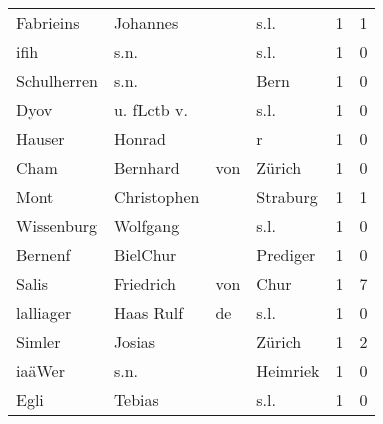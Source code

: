 \begin{center}
\begin{tiny}
\begin{longtabu}{llllrr}
                Fabrieins &                           Johannes &             &                                        s.l. &          1 &         1 \\
                     ifih &                               s.n. &             &                                        s.l. &          1 &         0 \\
              Schulherren &                               s.n. &             &                                        Bern &          1 &         0 \\
                     Dyov &                        u. fLctb v. &             &                                        s.l. &          1 &         0 \\
                   Hauser &                             Honrad &             &                                           r &          1 &         0 \\
                     Cham &                           Bernhard &         von &                                      Zürich &          1 &         0 \\
                     Mont &                        Christophen &             &                                    Straburg &          1 &         1 \\
               Wissenburg &                           Wolfgang &             &                                        s.l. &          1 &         0 \\
                  Bernenf &                           BielChur &             &                                    Prediger &          1 &         0 \\
                    Salis &                          Friedrich &         von &                                        Chur &          1 &         7 \\
                lalliager &                          Haas Rulf &          de &                                        s.l. &          1 &         0 \\
                   Simler &                             Josias &             &                                      Zürich &          1 &         2 \\
                   iaäWer &                               s.n. &             &                                    Heimriek &          1 &         0 \\
                     Egli &                             Tebias &             &                                        s.l. &          1 &         0 \\

\end{longtabu}
\end{tiny}
\end{center}

